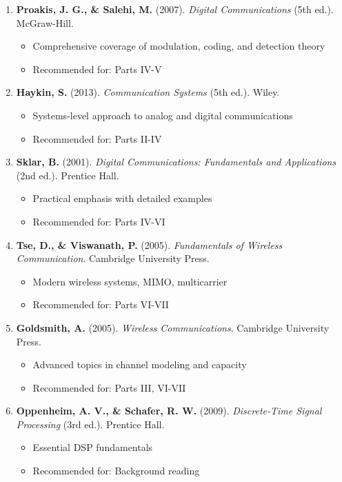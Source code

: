 \begin{enumerate}
\def\labelenumi{\arabic{enumi}.}
\tightlist
\item
  \textbf{Proakis, J. G., \& Salehi, M.} (2007). \emph{Digital
  Communications} (5th ed.). McGraw-Hill.

  \begin{itemize}
  \tightlist
  \item
    Comprehensive coverage of modulation, coding, and detection theory
  \item
    Recommended for: Parts IV-V
  \end{itemize}
\item
  \textbf{Haykin, S.} (2013). \emph{Communication Systems} (5th ed.).
  Wiley.

  \begin{itemize}
  \tightlist
  \item
    Systems-level approach to analog and digital communications
  \item
    Recommended for: Parts II-IV
  \end{itemize}
\item
  \textbf{Sklar, B.} (2001). \emph{Digital Communications: Fundamentals
  and Applications} (2nd ed.). Prentice Hall.

  \begin{itemize}
  \tightlist
  \item
    Practical emphasis with detailed examples
  \item
    Recommended for: Parts IV-VI
  \end{itemize}
\item
  \textbf{Tse, D., \& Viswanath, P.} (2005). \emph{Fundamentals of
  Wireless Communication}. Cambridge University Press.

  \begin{itemize}
  \tightlist
  \item
    Modern wireless systems, MIMO, multicarrier
  \item
    Recommended for: Parts VI-VII
  \end{itemize}
\item
  \textbf{Goldsmith, A.} (2005). \emph{Wireless Communications}.
  Cambridge University Press.

  \begin{itemize}
  \tightlist
  \item
    Advanced topics in channel modeling and capacity
  \item
    Recommended for: Parts III, VI-VII
  \end{itemize}
\item
  \textbf{Oppenheim, A. V., \& Schafer, R. W.} (2009).
  \emph{Discrete-Time Signal Processing} (3rd ed.). Prentice Hall.

  \begin{itemize}
  \tightlist
  \item
    Essential DSP fundamentals
  \item
    Recommended for: Background reading
  \end{itemize}
\end{enumerate}

